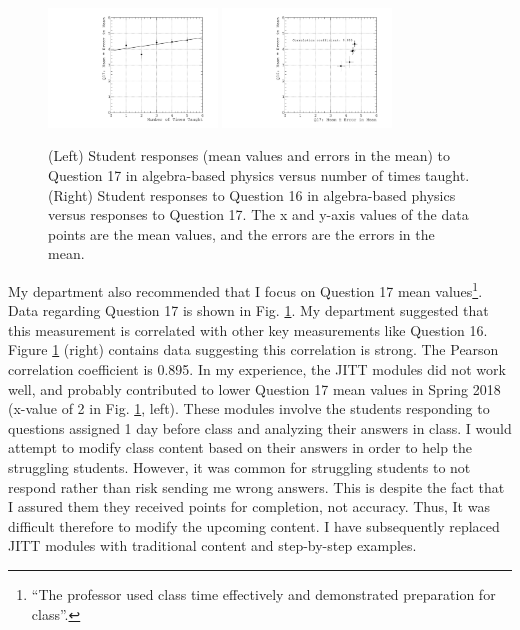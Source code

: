 \documentclass[../../main.tex]{subfiles}
\begin{document}
\begin{figure}[hb]
\centering
\includegraphics[width=0.4\textwidth]{Q17_algebra_based.pdf}
\includegraphics[width=0.4\textwidth]{Q16_Q17_algebra_based.pdf}
\caption{\label{fig:courses:intro_q17}  (Left) Student responses (mean values and errors in the mean) to Question 17 in algebra-based physics versus number of times taught. (Right) Student responses to Question 16 in algebra-based physics versus responses to Question 17.  The x and y-axis values of the data points are the mean values, and the errors are the errors in the mean.}
\end{figure}

My department also recommended that I focus on Question 17 mean values\footnote{``The professor used class time effectively and demonstrated preparation for class''.}.  Data regarding Question 17 is shown in Fig. \ref{fig:courses:intro_q17}.  My department suggested that this measurement is correlated with other key measurements like Question 16.  Figure \ref{fig:courses:intro_q17} (right) contains data suggesting this correlation is strong.  The Pearson correlation coefficient is 0.895.  In my experience, the JITT modules did not work well, and probably contributed to lower Question 17 mean values in Spring 2018 (x-value of 2 in Fig. \ref{fig:courses:intro_q17}, left).  These modules involve the students responding to questions assigned 1 day before class and analyzing their answers in class.  I would attempt to modify class content based on their answers in order to help the struggling students.  However, it was common for struggling students to not respond rather than risk sending me wrong answers.  This is despite the fact that I assured them they received points for completion, not accuracy.  Thus, It was difficult therefore to modify the upcoming content.  I have subsequently replaced JITT modules with traditional content and step-by-step examples.  \\ \hspace{0.1cm}
\end{document}
